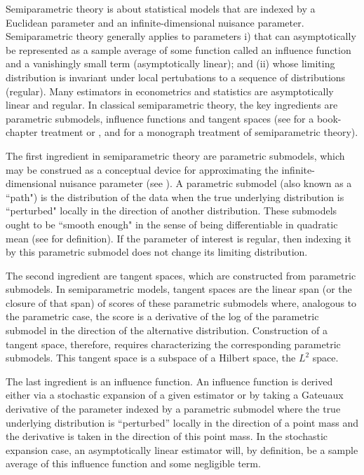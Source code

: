 Semiparametric theory is about statistical models that are indexed by a Euclidean parameter and an infinite-dimensional nuisance parameter. Semiparametric theory generally applies to parameters i) that can asymptotically be represented as a sample average of some function called an influence function and a vanishingly small term (asymptotically linear); and (ii) whose limiting distribution is invariant under local pertubations to a sequence of distributions (regular).  Many estimators in econometrics and statistics are asymptotically linear and regular. In classical semiparametric theory, the key ingredients are parametric submodels, influence functions and tangent spaces (see \citet{van_der_Vaart_1998} for a book-chapter treatment or \citet{bickel1993efficient}, \citet{kosorok2008introduction} and \citet{tsiatis2006semiparametric} for a monograph treatment of semiparametric theory).

The first ingredient in semiparametric theory are parametric submodels, which may be construed as a conceptual device for approximating the infinite-dimensional nuisance parameter (see \citet{tsiatis2006semiparametric}). A parametric submodel (also known as a ``path") is the distribution of the data when the true underlying distribution is ``perturbed"  locally in the direction of another distribution. These submodels ought to be ``smooth enough" in the sense of being differentiable in quadratic mean (see \citet{van_der_Vaart_1998} for definition). If the parameter of interest is regular, then indexing it by this parametric submodel does not change its limiting distribution. 

The second ingredient are tangent spaces, which are constructed from parametric submodels. In semiparametric models, tangent spaces are the linear span (or the closure of that span) of scores of these parametric submodels where, analogous to the parametric case, the score is a derivative of the log of the parametric submodel in the direction of the alternative distribution.  Construction of a tangent space, therefore, requires characterizing the corresponding parametric submodels. This tangent space is a subspace of a Hilbert space, the $L^2$ space.

The last ingredient is an influence function. An influence function is derived either via a stochastic expansion of a given estimator or by taking a Gateuaux derivative of the parameter indexed by a parametric submodel where the true underlying distribution is ``perturbed'' locally in the direction of a point mass and the derivative is taken in the direction of this point mass. In the stochastic expansion case, an asymptotically linear estimator will, by definition, be a sample average of this influence function and some negligible term.

